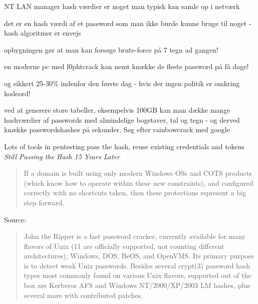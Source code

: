 \documentclass[Screen16to9,17pt]{foils}
\begin{document}

\begin{list1}
  \item NT LAN manager hash værdier er noget man typisk kan samle op i
  netværk
\item det er en hash værdi af et password som man ikke burde kunne
  bruge til noget - hash algoritmer er envejs
\item opbygningen gør at man kan forsøge brute-force på 7 tegn ad
  gangen!
\item en moderne pc med l0phtcrack kan nemt knække de fleste password
  på få dage!
\item og sikkert 25-30\% indenfor den første dag - hvis der ingen
  politik er omkring kodeord!
\item ved at generere store tabeller, eksempelvis 100GB kan man dække
  mange hashværdier af passwords med almindelige bogstaver, tal og
  tegn - og derved knække passwordshashes på sekunder. Søg efter
  rainbowcrack med google
\end{list1}



Lots of tools in pentesting pass the hash, reuse existing credentials and tokens
\emph{Still Passing the Hash 15 Years Later}\\

\begin{quote}
If a domain is built using only modern Windows OSs and COTS products (which know how to operate within these new constraints), and configured correctly with no shortcuts taken, then these protections represent a big step forward.
\end{quote}

Source:\\
{\small{}
}


\begin{quote}
John the Ripper is a fast password cracker, currently available for
many flavors of Unix (11 are officially supported, not counting
different architectures), Windows, DOS, BeOS, and OpenVMS. Its primary
purpose is to detect weak Unix passwords. Besides several crypt(3)
password hash types most commonly found on various Unix flavors,
supported out of the box are Kerberos AFS and Windows NT/2000/XP/2003
LM hashes, plus several more with contributed patches.
\end{quote}
\end{document}
